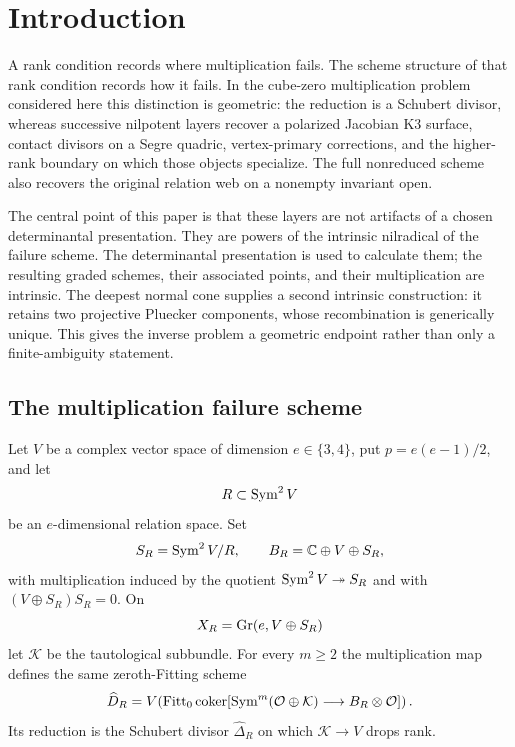 \section{Introduction}
\label{sec:introduction-v132}

A rank condition records where multiplication fails.  The scheme
structure of that rank condition records how it fails.  In the
cube-zero multiplication problem considered here this distinction is
geometric: the reduction is a Schubert divisor, whereas successive
nilpotent layers recover a polarized Jacobian K3 surface, contact
divisors on a Segre quadric, vertex-primary corrections, and the
higher-rank boundary on which those objects specialize.  The full
nonreduced scheme also recovers the original relation web on a nonempty invariant open.

The central point of this paper is that these layers are not artifacts
of a chosen determinantal presentation.  They are powers of the
intrinsic nilradical of the failure scheme.  The determinantal
presentation is used to calculate them; the resulting graded schemes,
their associated points, and their multiplication are intrinsic.
The deepest normal cone supplies a second intrinsic construction: it
retains two projective Pluecker components, whose recombination is
generically unique.  This gives the inverse problem a geometric
endpoint rather than only a finite-ambiguity statement.

\subsection{The multiplication failure scheme}

Let \(V\) be a complex vector space of dimension
\(e\in\{3,4\}\), put \(p=e(e-1)/2\), and let
\[
 R\subset\operatorname{Sym}^2V
\]
be an \(e\)-dimensional relation space.  Set
\[
 S_R=\operatorname{Sym}^2V/R,\qquad
 B_R=\mathbb C\oplus V\oplus S_R,
\]
with multiplication induced by the quotient
\(\operatorname{Sym}^2V\twoheadrightarrow S_R\) and with
\((V\oplus S_R)S_R=0\).  On
\[
 X_R=\operatorname{Gr}(e,V\oplus S_R)
\]
let \(\mathcal K\) be the tautological subbundle.  For every
\(m\ge2\) the multiplication map defines the same zeroth-Fitting
scheme
\begin{equation}\label{eq:failure-intro}
 \widehat D_R=
 V\!\left(
 \operatorname{Fitt}_0\operatorname{coker}[
 \operatorname{Sym}^m(\mathcal O\oplus\mathcal K)\longrightarrow
 B_R\otimes\mathcal O]\right).
\end{equation}
Its reduction is the Schubert divisor
\(\widehat\Delta_R\) on which \(\mathcal K\to V\) drops rank.

